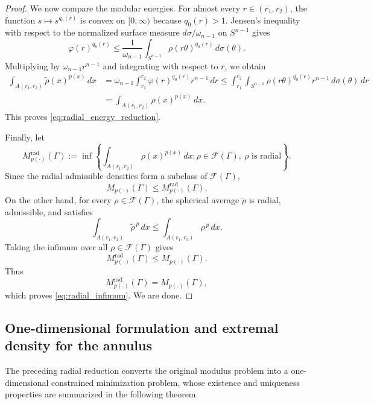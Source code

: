 \documentclass[12pt]{amsart}
\numberwithin{equation}{section}
\theoremstyle{plain}
\theoremstyle{definition}
\begin{document}
\begin{proof}
We now compare the modular energies. For almost every
$r\in(r_1,r_2)$, the function
$s\longmapsto s^{q_0(r)}$
is convex on $[0,\infty)$ because $q_0(r)>1$. Jensen's inequality
with respect to the normalized surface measure
$d\sigma/\omega_{n-1}$ on $S^{n-1}$ gives
\begin{equation*}
\varphi(r)^{q_0(r)}
\le
\frac{1}{\omega_{n-1}}
\int_{S^{n-1}}
\rho(r\theta)^{q_0(r)}
\,d\sigma(\theta).
\end{equation*}
Multiplying by $\omega_{n-1}r^{n-1}$ and integrating with respect to
$r$, we obtain
\begin{align*}
\int_{A(r_1,r_2)}
\widetilde\rho(x)^{p(x)}\,dx
&=
\omega_{n-1}
\int_{r_1}^{r_2}
\varphi(r)^{q_0(r)}r^{n-1}\,dr
\le
\int_{r_1}^{r_2}
\int_{S^{n-1}}
\rho(r\theta)^{q_0(r)}
r^{n-1}\,d\sigma(\theta)\,dr
\\
&=
\int_{A(r_1,r_2)}
\rho(x)^{p(x)}\,dx.
\end{align*}
This proves \eqref{eq:radial_energy_reduction}.

Finally, let
\begin{equation*}
M_{p(\cdot)}^{\mathrm{rad}}(\Gamma)
:=
\inf\left\{
\int_{A(r_1,r_2)}
\rho(x)^{p(x)}\,dx:
\rho\in\mathcal F(\Gamma),
\ \rho\text{ is radial}
\right\}.
\end{equation*}
Since the radial admissible densities form a subclass of
$\mathcal F(\Gamma)$,
\begin{equation*}
M_{p(\cdot)}(\Gamma)
\le
M_{p(\cdot)}^{\mathrm{rad}}(\Gamma).
\end{equation*}
On the other hand, for every $\rho\in\mathcal F(\Gamma)$, the spherical
average $\widetilde\rho$ is radial, admissible, and satisfies
\begin{equation*}
\int_{A(r_1,r_2)}
\widetilde\rho^{\,p}\,dx
\le
\int_{A(r_1,r_2)}
\rho^{\,p}\,dx.
\end{equation*}
Taking the infimum over all $\rho\in\mathcal F(\Gamma)$ gives
\begin{equation*}
M_{p(\cdot)}^{\mathrm{rad}}(\Gamma)
\le
M_{p(\cdot)}(\Gamma).
\end{equation*}
Thus
\begin{equation*}
M_{p(\cdot)}^{\mathrm{rad}}(\Gamma)
=
M_{p(\cdot)}(\Gamma),
\end{equation*}
which proves \eqref{eq:radial_infimum}. We are done.
\end{proof}



\subsection{One-dimensional formulation and extremal density for the annulus}
The preceding radial reduction converts the original modulus problem into a
one-dimensional constrained minimization problem, whose existence and
uniqueness properties are summarized in the following theorem.
\end{document}
